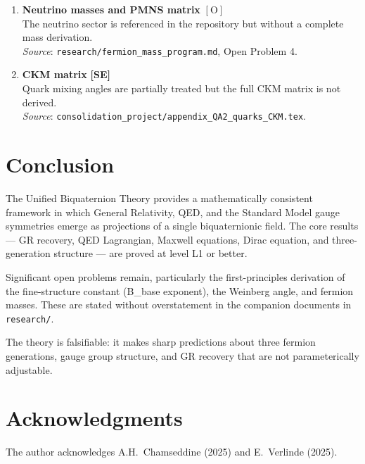 \documentclass[12pt,a4paper]{article}
\newcommand{\SE}{\textbf{[SE]}}
\begin{document}
\begin{enumerate}
\item \textbf{Neutrino masses and PMNS matrix} \hfill $[\mathrm{O}]$\\
The neutrino sector is referenced in the repository but without a complete
mass derivation.\\
\textit{Source}: \texttt{research/fermion\_mass\_program.md}, Open Problem 4.

\item \textbf{CKM matrix} \hfill \SE{}\\
Quark mixing angles are partially treated but the full CKM matrix is not
derived.\\
\textit{Source}: \texttt{consolidation\_project/appendix\_QA2\_quarks\_CKM.tex}.

\end{enumerate}

\section*{Conclusion}

The Unified Biquaternion Theory provides a mathematically consistent
framework in which General Relativity, QED, and the Standard Model gauge
symmetries emerge as projections of a single biquaternionic field.
The core results — GR recovery, QED Lagrangian, Maxwell equations,
Dirac equation, and three-generation structure — are proved at level L1 or
better.

Significant open problems remain, particularly the first-principles derivation
of the fine-structure constant (B_base exponent), the Weinberg angle, and
fermion masses.  These are stated without overstatement in the companion
documents in \texttt{research/}.

The theory is falsifiable: it makes sharp predictions about three fermion
generations, gauge group structure, and GR recovery that are not parameterically
adjustable.

\section*{Acknowledgments}

The author acknowledges A.H.\ Chamseddine (2025) and E.\ Verlinde (2025).
\end{document}
